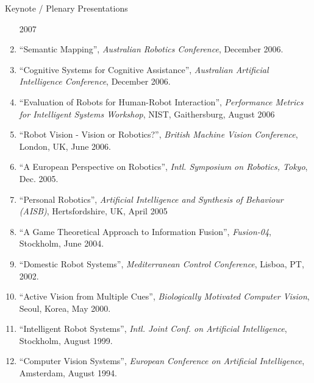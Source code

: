 \documentclass{article}
\begin{document}
\begin{cv}
\begin{cvlist}{Keynote / Plenary Presentations}
\begin{enumerate}
			      2007
			\item ``Semantic Mapping'', {\em Australian Robotics Conference},
			      December 2006.
			\item ``Cognitive Systems for Cognitive Assistance'', {\em
					      Australian Artificial Intelligence Conference}, December 2006.
			\item ``Evaluation of Robots for Human-Robot Interaction'', {\em
					      Performance Metrics for Intelligent Systems Workshop}, NIST,
			      Gaithersburg, August 2006
			\item ``Robot Vision - Vision or Robotics?'', {\em British Machine
					      Vision Conference}, London, UK, June 2006.
			\item ``A European Perspective on Robotics'', {\em Intl. Symposium
					      on Robotics, Tokyo}, Dec. 2005.
			\item ``Personal Robotics'', {\em Artificial Intelligence and
					      Synthesis of Behaviour (AISB)}, Hertsfordshire, UK, April 2005
			\item ``A Game Theoretical Approach to Information Fusion'', {\em
					      Fusion-04}, Stockholm, June 2004.
			\item ``Domestic Robot Systems'', {\em Mediterranean Control
					      Conference}, Lisboa, PT, 2002.
			\item ``Active Vision from Multiple Cues'', {\em Biologically
					      Motivated Computer Vision}, Seoul, Korea, May 2000.
			\item ``Intelligent Robot Systems'', {\em Intl. Joint Conf. on Artificial
					      Intelligence}, Stockholm, August 1999.
			\item ``Computer Vision Systems'', {\em European Conference on
					      Artificial Intelligence}, Amsterdam, August 1994.
		\end{enumerate}
	\end{cvlist}


\end{cv}
\end{document}
